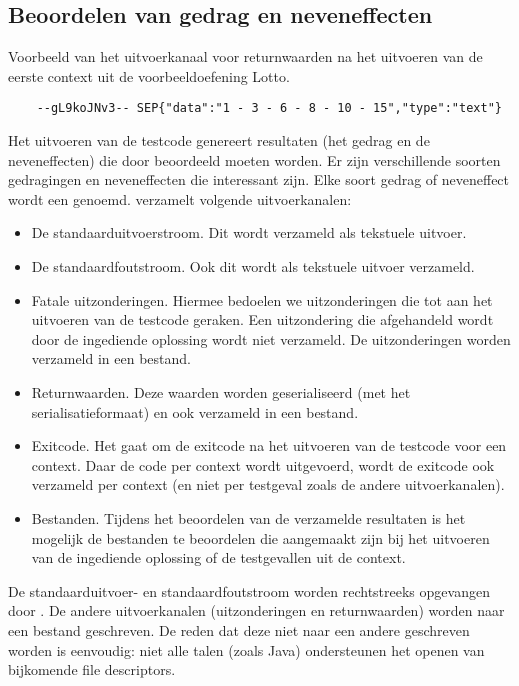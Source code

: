 \subsection{Beoordelen van gedrag en neveneffecten}\label{subsec:beoordelen-van-gedrag}

\begin{listing}[h]
    \caption{Voorbeeld van het uitvoerkanaal voor returnwaarden na het uitvoeren van de eerste context uit de voorbeeldoefening Lotto.}
    \label{lst:uitvoer}
    \begin{verbatim}
    --gL9koJNv3-- SEP{"data":"1 - 3 - 6 - 8 - 10 - 15","type":"text"}
    \end{verbatim}
\end{listing}

Het uitvoeren van de testcode genereert resultaten (het gedrag en de neveneffecten) die door \tested{} beoordeeld moeten worden.
Er zijn verschillende soorten gedragingen en neveneffecten die interessant zijn.
Elke soort gedrag of neveneffect wordt een  genoemd.
\tested{} verzamelt volgende uitvoerkanalen:
\begin{itemize}
    \item De standaarduitvoerstroom.
    Dit wordt verzameld als tekstuele uitvoer.
    \item De standaardfoutstroom.
    Ook dit wordt als tekstuele uitvoer verzameld.
    \item Fatale uitzonderingen.
    Hiermee bedoelen we uitzonderingen die tot aan het uitvoeren van de testcode geraken.
    Een uitzondering die afgehandeld wordt door de ingediende oplossing wordt niet verzameld.
    De uitzonderingen worden verzameld in een bestand.
    \item Returnwaarden.
    Deze waarden worden geserialiseerd (met het serialisatieformaat) en ook verzameld in een bestand.
    \item Exitcode.
    Het gaat om de exitcode na het uitvoeren van de testcode voor een context.
    Daar de code per context wordt uitgevoerd, wordt de exitcode ook verzameld per context (en niet per testgeval zoals de andere uitvoerkanalen).
    \item Bestanden.
    Tijdens het beoordelen van de verzamelde resultaten is het mogelijk de bestanden te beoordelen die aangemaakt zijn bij het uitvoeren van de ingediende oplossing of de testgevallen uit de context.
\end{itemize}

De standaarduitvoer- en standaardfoutstroom worden rechtstreeks opgevangen door \tested{}.
De andere uitvoerkanalen (uitzonderingen en returnwaarden) worden naar een bestand geschreven.
De reden dat deze niet naar een andere  geschreven worden is eenvoudig: niet alle talen (zoals Java) ondersteunen het openen van bijkomende file descriptors.

